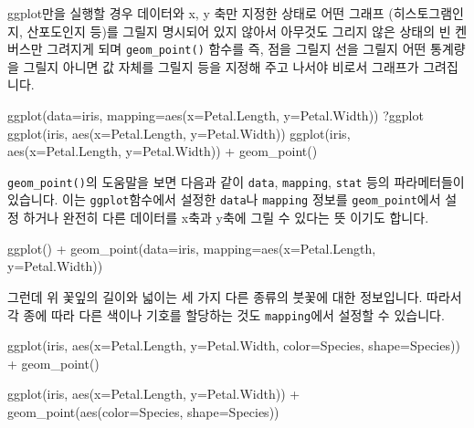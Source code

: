 \documentclass[
]{book}
\newenvironment{Shaded}{\begin{snugshade}}{\end{snugshade}}
\newcommand{\AttributeTok}[1]{\textcolor[rgb]{0.77,0.63,0.00}{#1}}
\newcommand{\FunctionTok}[1]{\textcolor[rgb]{0.00,0.00,0.00}{#1}}
\newcommand{\NormalTok}[1]{#1}
\newcommand{\SpecialCharTok}[1]{\textcolor[rgb]{0.00,0.00,0.00}{#1}}
\begin{document}
ggplot만을 실행할 경우 데이터와 x, y 축만 지정한 상태로 어떤 그래프 (히스토그램인지, 산포도인지 등)를 그릴지 명시되어 있지 않아서 아무것도 그리지 않은 상태의 빈 켄버스만 그려지게 되며 \texttt{geom\_point()} 함수를 즉, 점을 그릴지 선을 그릴지 어떤 통계량을 그릴지 아니면 값 자체를 그릴지 등을 지정해 주고 나서야 비로서 그래프가 그려집니다.

\begin{Shaded}
\begin{Highlighting}[]
\FunctionTok{ggplot}\NormalTok{(}\AttributeTok{data=}\NormalTok{iris, }\AttributeTok{mapping=}\FunctionTok{aes}\NormalTok{(}\AttributeTok{x=}\NormalTok{Petal.Length, }\AttributeTok{y=}\NormalTok{Petal.Width))}
\NormalTok{?ggplot}
\FunctionTok{ggplot}\NormalTok{(iris, }\FunctionTok{aes}\NormalTok{(}\AttributeTok{x=}\NormalTok{Petal.Length, }\AttributeTok{y=}\NormalTok{Petal.Width))}
\FunctionTok{ggplot}\NormalTok{(iris, }\FunctionTok{aes}\NormalTok{(}\AttributeTok{x=}\NormalTok{Petal.Length, }\AttributeTok{y=}\NormalTok{Petal.Width)) }\SpecialCharTok{+} \FunctionTok{geom\_point}\NormalTok{()}
\end{Highlighting}
\end{Shaded}

\texttt{geom\_point()}의 도움말을 보면 다음과 같이 \texttt{data}, \texttt{mapping}, \texttt{stat} 등의 파라메터들이 있습니다. 이는 \texttt{ggplot}함수에서 설정한 \texttt{data}나 \texttt{mapping} 정보를 \texttt{geom\_point}에서 설정 하거나 완전히 다른 데이터를 x축과 y축에 그릴 수 있다는 뜻 이기도 합니다.

\begin{Shaded}
\begin{Highlighting}[]
\FunctionTok{ggplot}\NormalTok{() }\SpecialCharTok{+} 
  \FunctionTok{geom\_point}\NormalTok{(}\AttributeTok{data=}\NormalTok{iris, }\AttributeTok{mapping=}\FunctionTok{aes}\NormalTok{(}\AttributeTok{x=}\NormalTok{Petal.Length, }\AttributeTok{y=}\NormalTok{Petal.Width)) }
\end{Highlighting}
\end{Shaded}

그런데 위 꽃잎의 길이와 넓이는 세 가지 다른 종류의 붓꽃에 대한 정보입니다. 따라서 각 종에 따라 다른 색이나 기호를 할당하는 것도 \texttt{mapping}에서 설정할 수 있습니다.

\begin{Shaded}
\begin{Highlighting}[]
\FunctionTok{ggplot}\NormalTok{(iris, }\FunctionTok{aes}\NormalTok{(}\AttributeTok{x=}\NormalTok{Petal.Length, }
                 \AttributeTok{y=}\NormalTok{Petal.Width, }
                 \AttributeTok{color=}\NormalTok{Species, }
                 \AttributeTok{shape=}\NormalTok{Species)) }\SpecialCharTok{+} 
  \FunctionTok{geom\_point}\NormalTok{()}

\FunctionTok{ggplot}\NormalTok{(iris, }\FunctionTok{aes}\NormalTok{(}\AttributeTok{x=}\NormalTok{Petal.Length, }\AttributeTok{y=}\NormalTok{Petal.Width)) }\SpecialCharTok{+} 
  \FunctionTok{geom\_point}\NormalTok{(}\FunctionTok{aes}\NormalTok{(}\AttributeTok{color=}\NormalTok{Species, }\AttributeTok{shape=}\NormalTok{Species))}
\end{Highlighting}
\end{Shaded}
\end{document}
